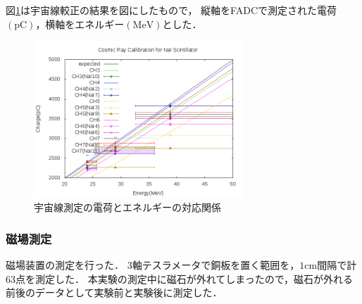 図\ref{cali}は宇宙線較正の結果を図にしたもので，
縦軸をFADCで測定された電荷$(\mathrm{pC})$，横軸をエネルギー$(\mathrm{MeV})$とした．
\begin{figure}[H]
  \centering
      \includegraphics[width=0.7\textwidth]{figure/tajima/fit.png}
      \caption{宇宙線測定の電荷とエネルギーの対応関係}\label{cali}
\end{figure}
\newpage
\subsubsection{磁場測定}
磁場装置の測定を行った．
3軸テスラメータで銅板を置く範囲を，$1\mathrm{cm}$間隔で計63点を測定した．
本実験の測定中に磁石が外れてしまったので，磁石が外れる前後のデータとして実験前と実験後に測定した．

